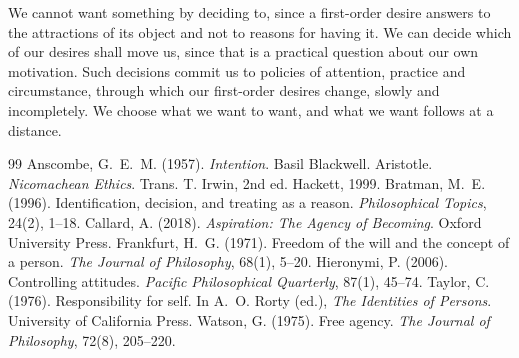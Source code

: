 \documentclass{situationist-preprint}
\begin{document}
We cannot want something by deciding to, since a first-order desire answers to the attractions of its object and not to reasons for having it. We can decide which of our desires shall move us, since that is a practical question about our own motivation. Such decisions commit us to policies of attention, practice and circumstance, through which our first-order desires change, slowly and incompletely. We choose what we want to want, and what we want follows at a distance.

\begin{thebibliography}{99}\small
{} Anscombe, G.~E.~M. (1957). \emph{Intention}. Basil Blackwell.
 Aristotle. \emph{Nicomachean Ethics}. Trans. T. Irwin, 2nd ed. Hackett, 1999.
 Bratman, M.~E. (1996). Identification, decision, and treating as a reason. \emph{Philosophical Topics}, 24(2), 1--18.
 Callard, A. (2018). \emph{Aspiration: The Agency of Becoming}. Oxford University Press.
 Frankfurt, H.~G. (1971). Freedom of the will and the concept of a person. \emph{The Journal of Philosophy}, 68(1), 5--20.
 Hieronymi, P. (2006). Controlling attitudes. \emph{Pacific Philosophical Quarterly}, 87(1), 45--74.
 Taylor, C. (1976). Responsibility for self. In A.~O. Rorty (ed.), \emph{The Identities of Persons}. University of California Press.
 Watson, G. (1975). Free agency. \emph{The Journal of Philosophy}, 72(8), 205--220.
\end{thebibliography}
\end{document}
